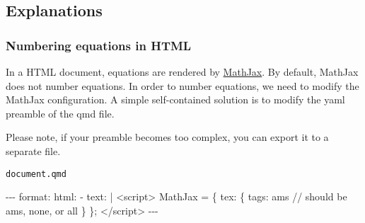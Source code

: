 \documentclass[
  letterpaper,
  DIV=11,
  numbers=noendperiod]{scrartcl}
\newenvironment{Shaded}{\begin{snugshade}}{\end{snugshade}}
\newcommand{\AttributeTok}[1]{\textcolor[rgb]{0.40,0.45,0.13}{#1}}
\newcommand{\CharTok}[1]{\textcolor[rgb]{0.13,0.47,0.30}{#1}}
\newcommand{\FunctionTok}[1]{\textcolor[rgb]{0.28,0.35,0.67}{#1}}
\newcommand{\KeywordTok}[1]{\textcolor[rgb]{0.00,0.23,0.31}{#1}}
\newcommand{\NormalTok}[1]{\textcolor[rgb]{0.00,0.23,0.31}{#1}}
\newcommand{\PreprocessorTok}[1]{\textcolor[rgb]{0.68,0.00,0.00}{#1}}
\theoremstyle{plain}
\theoremstyle{remark}
\begin{document}
\hypertarget{sec-explanations}{%
\subsection{Explanations}\label{sec-explanations}}

\hypertarget{numbering-equations-in-html}{%
\subsubsection{Numbering equations in
HTML}\label{numbering-equations-in-html}}

In a HTML document, equations are rendered by
\href{https://www.mathjax.org/}{MathJax}. By default, MathJax does not
number equations. In order to number equations, we need to modify the
MathJax configuration. A simple self-contained solution is to modify the
yaml preamble of the qmd file.

Please note, if your preamble becomes too complex, you can export it to
a separate file.

\begin{codelisting}

\caption{\texttt{document.qmd}}

\begin{Shaded}
\begin{Highlighting}[]
\PreprocessorTok{{-}{-}{-}}
\FunctionTok{format}\KeywordTok{:}
\AttributeTok{  }\FunctionTok{html}\KeywordTok{:}
\KeywordTok{        {-} }\FunctionTok{text}\KeywordTok{:}\AttributeTok{ }\CharTok{|}
\NormalTok{            \textless{}script\textgreater{}}
\NormalTok{            MathJax = \{}
\NormalTok{                tex: \{}
\NormalTok{                    tags: \textquotesingle{}ams\textquotesingle{}  // should be \textquotesingle{}ams\textquotesingle{}, \textquotesingle{}none\textquotesingle{}, or \textquotesingle{}all\textquotesingle{}}
\NormalTok{                \}}
\NormalTok{            \};}
\NormalTok{            \textless{}/script\textgreater{}}
\PreprocessorTok{{-}{-}{-}}
\end{Highlighting}
\end{Shaded}

\end{codelisting}
\end{document}
